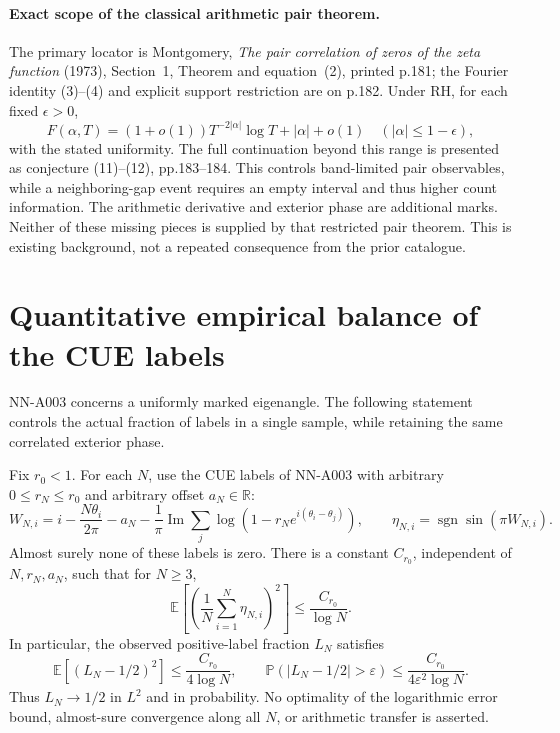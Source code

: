 \paragraph{Exact scope of the classical arithmetic pair theorem.}
The primary locator is Montgomery, \emph{The pair correlation of zeros
of the zeta function} (1973), Section~1, Theorem and equation~(2),
printed p.181; the Fourier identity (3)--(4) and explicit support
restriction are on p.182. Under RH, for each fixed $\epsilon>0$,
\[
 F(\alpha,T)=(1+o(1))T^{-2|\alpha|}\log T+|\alpha|+o(1)
 \quad (|\alpha|\le1-\epsilon),
\]
with the stated uniformity. The full continuation beyond this range
is presented as conjecture (11)--(12), pp.183--184. This controls
band-limited pair observables, while a neighboring-gap event requires
an empty interval and thus higher count information. The arithmetic
derivative and exterior phase are additional marks. Neither of these
missing pieces is supplied by that restricted pair theorem. This is
existing background, not a repeated consequence from the prior catalogue.


\section{Quantitative empirical balance of the CUE labels}
\label{sec:analytic-cue-empirical-balance}

NN-A003 concerns a uniformly marked eigenangle. The following
statement controls the actual fraction of labels in a single
sample, while retaining the same correlated exterior phase.

\begin{theorem}
\label{thm:analytic-cue-empirical-balance}
Fix $r_0<1$. For each $N$, use the CUE labels of NN-A003 with
arbitrary $0\le r_N\le r_0$ and arbitrary offset $a_N\in\mathbb R$:
\[
 W_{N,i}=i-\frac{N\theta_i}{2\pi}-a_N
          -\frac1\pi\operatorname{Im}\sum_j
                   \log(1-r_Ne^{i(\theta_i-\theta_j)}),
 \qquad \eta_{N,i}=\operatorname{sgn}\sin(\pi W_{N,i}).
\]
Almost surely none of these labels is zero. There is a constant
$C_{r_0}$, independent of $N,r_N,a_N$, such that for $N\ge3$,
\begin{equation}\label{eq:analytic-cue-empirical-rate}
 \mathbb E\left[\left(\frac1N\sum_{i=1}^N\eta_{N,i}\right)^2\right]
                          \le\frac{C_{r_0}}{\log N}.
\end{equation}
In particular, the observed positive-label fraction $L_N$ satisfies
\[
 \mathbb E[(L_N-1/2)^2]\le\frac{C_{r_0}}{4\log N},\qquad
 \mathbb P(|L_N-1/2|>\varepsilon)
                   \le\frac{C_{r_0}}{4\varepsilon^2\log N}.
\]
Thus $L_N\to1/2$ in $L^2$ and in probability. No optimality of
the logarithmic error bound, almost-sure convergence along all
$N$, or arithmetic transfer is asserted.
\end{theorem}

